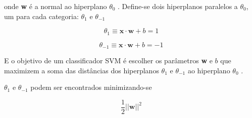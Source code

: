 onde \textbf{w} é a normal ao hiperplano \ensuremath{\theta_0} \cite{mono-puc}. Define-se dois hiperplanos paralelos a \ensuremath{\theta_0}, um para cada categoria: \ensuremath{\theta_1} e \ensuremath{\theta_{-1}} \cite{mono-puc}


\begin{equation}
\label{theta1:svm}
\ensuremath{\theta_1 \equiv } \textbf{x} \ensuremath{\cdot} \textbf{w} + \ensuremath{b} = 1
\end{equation}

\begin{equation}
\label{thetamenos1:svm}
\ensuremath{\theta_{-1} \equiv } \textbf{x} \ensuremath{\cdot} \textbf{w} + \ensuremath{b} = -1
\end{equation}

E o objetivo de um classificador SVM é escolher os parâmetros \textbf{w} e \ensuremath{b} que maximizem a soma das distâncias dos hiperplanos \ensuremath{\theta_1} e \ensuremath{\theta_{-1}} ao hiperplano \ensuremath{\theta_0} \cite{mono-puc}.
 

\ensuremath{\theta_1} e \ensuremath{\theta_{-1}} podem ser encontrados minimizando-se 

\begin{equation}
\label{optim:svm}
\ensuremath{\frac{1}{2}||}\textbf{w}\ensuremath{||^2}
\end{equation}

